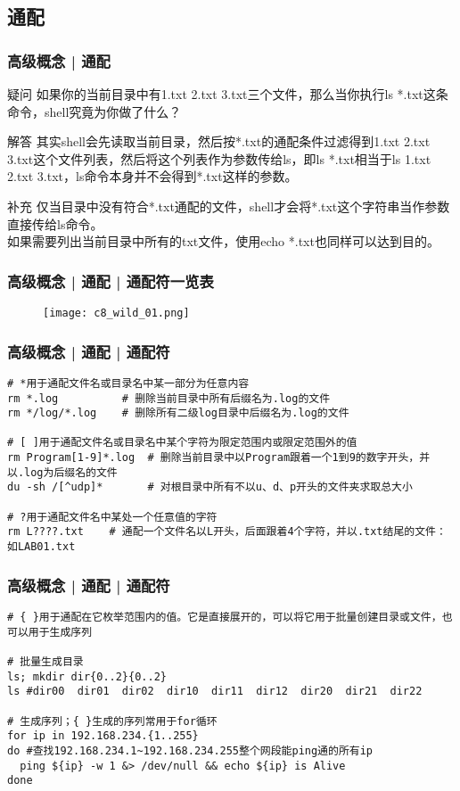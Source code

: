 \subsection{通配}
\begin{frame}
  \frametitle{高级概念 | 通配}
  \begin{block}{疑问}
    如果你的当前目录中有1.txt 2.txt 3.txt三个文件，那么当你执行ls *.txt这条命令，shell究竟为你做了什么？
  \end{block}
  \pause
  \begin{block}{解答}
    其实shell会先读取当前目录，然后按*.txt的通配条件过滤得到1.txt 2.txt 3.txt这个文件列表，然后将这个列表作为参数传给ls，即ls *.txt相当于ls 1.txt 2.txt 3.txt，ls命令本身并不会得到*.txt这样的参数。
  \end{block}
  \pause
  \begin{block}{补充}
    仅当目录中没有符合*.txt通配的文件，shell才会将*.txt这个字符串当作参数直接传给ls命令。\\
    如果需要列出当前目录中所有的txt文件，使用echo *.txt也同样可以达到目的。
  \end{block}
\end{frame}

\begin{frame}
  \frametitle{高级概念 | 通配 | 通配符一览表}
  \begin{figure}
    \centering
    \texttt{[image: c8\_wild\_01.png]}
  \end{figure}
\end{frame}

\begin{frame}[fragile]
  \frametitle{高级概念 | 通配 | 通配符}
  \vspace{-0.5em}
\begin{lstlisting}
# *用于通配文件名或目录名中某一部分为任意内容
rm *.log          # 删除当前目录中所有后缀名为.log的文件
rm */log/*.log    # 删除所有二级log目录中后缀名为.log的文件

# [ ]用于通配文件名或目录名中某个字符为限定范围内或限定范围外的值
rm Program[1-9]*.log  # 删除当前目录中以Program跟着一个1到9的数字开头，并以.log为后缀名的文件
du -sh /[^udp]*       # 对根目录中所有不以u、d、p开头的文件夹求取总大小

# ?用于通配文件名中某处一个任意值的字符
rm L????.txt    # 通配一个文件名以L开头，后面跟着4个字符，并以.txt结尾的文件：如LAB01.txt
\end{lstlisting}
\end{frame}

\begin{frame}[fragile]
  \frametitle{高级概念 | 通配 | 通配符}
\begin{lstlisting}
# { }用于通配在它枚举范围内的值。它是直接展开的，可以将它用于批量创建目录或文件，也可以用于生成序列

# 批量生成目录
ls; mkdir dir{0..2}{0..2}
ls #dir00  dir01  dir02  dir10  dir11  dir12  dir20  dir21  dir22

# 生成序列；{ }生成的序列常用于for循环
for ip in 192.168.234.{1..255}
do #查找192.168.234.1~192.168.234.255整个网段能ping通的所有ip
  ping ${ip} -w 1 &> /dev/null && echo ${ip} is Alive
done
\end{lstlisting}
\end{frame}

